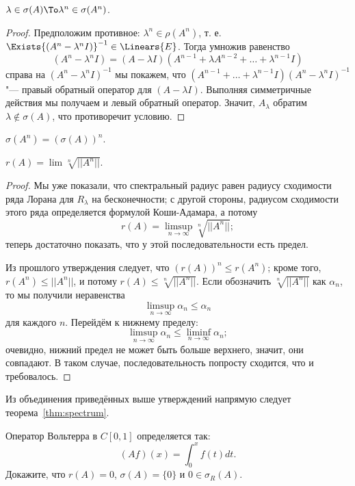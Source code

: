 \documentclass[main]{subfiles}
\begin{document}
\begin{proposition} %
  \( \lambda \in \sigma(A) \To \lambda^n \in \sigma(A^n) \).
\end{proposition}

\begin{proof}
  Предположим противное: \( \lambda^n \in \rho(A^n) \), т. е.
  \( \Exists {(A^n - \lambda^n I)}^{-1} \in \Linears{E} \).
  Тогда умножив равенство
  \[
    (A^n - \lambda^n I) = (A - \lambda I)
    (A^{n -1} + \lambda A^{n-2} + \dots + \lambda^{n-1} I)
  \]
  справа на \( {(A^n - \lambda^n I)}^{-1} \) мы покажем,
  что \( (A^{n -1} + \dots + \lambda^{n-1} I) {(A^n - \lambda^n I)}^{-1} \)
  "--- правый обратный оператор для \( (A - \lambda I) \).
  Выполняя симметричные действия мы получаем и левый обратный оператор.
  Значит, \( A_\lambda \) обратим \( \lambda \notin \sigma(A) \),
  что противоречит условию.
\end{proof}

\begin{exercise}
  \( \sigma(A^n) = {(\sigma(A))}^n \).
\end{exercise}

\begin{proposition}
  $ r(A) = \lim \sqrt[n]{||A^n||} $.
\end{proposition}
\begin{proof}
  Мы уже показали, что спектральный радиус равен радиусу сходимости
  ряда Лорана для \( R_\lambda \) на бесконечности;
  с другой стороны, радиусом сходимости этого ряда определяется
  формулой Коши-Адамара, а потому
  \[
    r(A) = \limsup_{n \to \infty} \sqrt[n]{||A^n||};
  \]
  теперь достаточно показать, что у этой последовательности есть предел.

  Из прошлого утверждения следует,
  что \( {\left( r(A) \right)}^n \le r(A^n) \);
  кроме того, \( r(A^n) \le ||A^n|| \),
  и потому \( r(A) \le \sqrt[n]{||A^n||} \).
  Если обозначить \( \sqrt[n]{||A^n||} \) как \( \alpha_n \),
  то мы получили неравенства
  \[
    \limsup_{n \to \infty} \alpha_n \le \alpha_n
  \]
  для каждого \( n \). Перейдём к нижнему пределу:
  \[
    \limsup_{n \to \infty} \alpha_n \le \liminf_{n \to \infty} \alpha_n;
  \]
  очевидно, нижний предел не может быть больше верхнего,
  значит, они совпадают. В таком случае,
  последовательность попросту сходится,
  что и требовалось.
\end{proof}

Из объединения приведённых выше утверждений
напрямую следует теорема~\ref{thm:spectrum}.

\begin{exercise}
  Оператор Вольтерра в \( C[0, 1] \) определяется так:
  \[ (Af)(x) = \int_{0}^x f(t) dt. \]
  Докажите, что \( r(A) = 0 \), \( \sigma(A) = \{ 0 \} \)
  и \( 0 \in \sigma_R(A) \).
\end{exercise}
 
\end{document}
